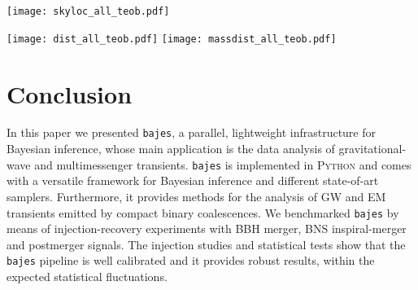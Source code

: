 \documentclass[prd,aps,twocolumn,a4paper,showkeys,nofootinbib,floatfix]{revtex4-1}
\newcommand{\bajes}{{\tt bajes}}
\newcommand{\py}{\textsc{Python}}
\begin{document}
\begin{figure*}[t]
	\centering 
	\texttt{[image: skyloc\_all\_teob.pdf]}
	\caption{Marginalized posterior distribution for
		right ascension and declination angles $\{\alpha,\delta\}$
		(represented using a Mollweide projection)
		for the BBH mergers presented in GWTC-1~\cite{LIGOScientific:2018mvr}. 
		The analyses are performed using the {\bajes} pipeline
		and {\tt TEOBResumS} waveform approximant.
		The right ascension $\alpha$ is expressed in hours,
		while the declination $\delta$ is reported in degrees.
		The contours refer to the 90\% credible regions.}
	\label{fig:skyloc_catalog}
\end{figure*}

\begin{figure*}[t]
	\centering 
	\texttt{[image: dist\_all\_teob.pdf]}
	\texttt{[image: massdist\_all\_teob.pdf]}
	\caption{Marginalized posterior distribution for
		inclination angle and luminosity distance $\{\iota,D_L\}$ (left)
		and for luminosity distance and total mass 
		$\{D_L,M\}$ (right)
		for the BBH mergers presented in GWTC-1~\cite{LIGOScientific:2018mvr}. 
		The analyses are performed using the {\bajes} pipeline
		and {\tt TEOBResumS} waveform approximant.
		The contours refer to the 90\% credible regions.}
	\label{fig:dist_catalog}
\end{figure*}


\section{Conclusion} 
\label{sec:conclusion}

In this paper we presented {\bajes},
a parallel, lightweight infrastructure 
for Bayesian inference, whose
main application is the data analysis of gravitational-wave and 
multimessenger transients.
{\bajes} is implemented in {\py} and
 comes with a versatile framework for Bayesian inference and different
 state-of-art 
 samplers.
Furthermore, it provides methods for the analysis of GW and
EM transients emitted by compact binary coalescences.
We benchmarked {\bajes} by means of
  injection-recovery experiments with BBH merger, BNS inspiral-merger
  and postmerger signals.
The injection studies and statistical tests show that the {\bajes} pipeline 
is well calibrated and it provides robust results,
within the expected statistical fluctuations.
\end{document}

